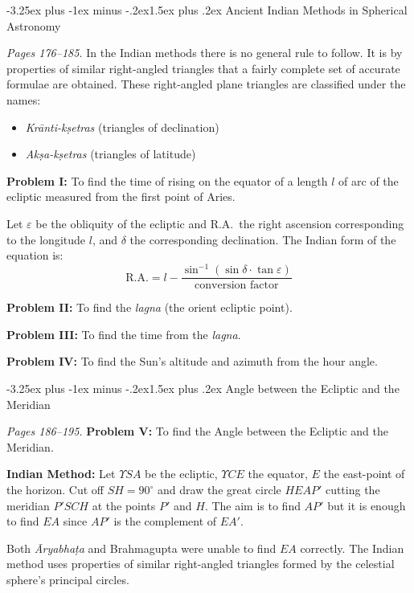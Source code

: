 \documentclass[11pt,a4paper]{article}
\makeatletter
\renewcommand{\subsection}{\@startsection{subsection}{2}{\z@}%
  {-3.25ex plus -1ex minus -.2ex}{1.5ex plus .2ex}%
  {\normalfont\large\bfseries\color{sectioncolor}}}
\newcommand{\cnote}[1]{\textcolor{notecolor}{\textit{#1}}}
\makeatother
\begin{document}
\subsection{Ancient Indian Methods in Spherical Astronomy}

\cnote{Pages 176--185.} In the Indian methods there is no general rule to follow. It is by properties of similar right-angled triangles that a fairly complete set of accurate formulae are obtained. These right-angled plane triangles are classified under the names:
\begin{itemize}
\item \textit{Krānti-kṣetras} (triangles of declination)
\item \textit{Akṣa-kṣetras} (triangles of latitude)
\end{itemize}

\textbf{Problem I:} To find the time of rising on the equator of a length $l$ of arc of the ecliptic measured from the first point of Aries.

Let $\varepsilon$ be the obliquity of the ecliptic and R.A.\ the right ascension corresponding to the longitude $l$, and $\delta$ the corresponding declination. The Indian form of the equation is:
\[
\text{R.A.} = l - \frac{\sin^{-1}(\sin \delta \cdot \tan \varepsilon)}{\text{conversion factor}}
\]

\textbf{Problem II:} To find the \textit{lagna} (the orient ecliptic point).

\textbf{Problem III:} To find the time from the \textit{lagna}.

\textbf{Problem IV:} To find the Sun's altitude and azimuth from the hour angle.

\subsection{Angle between the Ecliptic and the Meridian}

\cnote{Pages 186--195.} \textbf{Problem V:} To find the Angle between the Ecliptic and the Meridian.

\textbf{Indian Method:} Let $\Upsilon SA$ be the ecliptic, $\Upsilon CE$ the equator, $E$ the east-point of the horizon. Cut off $SH = 90^\circ$ and draw the great circle $HEAP'$ cutting the meridian $P'SCH$ at the points $P'$ and $H$. The aim is to find $AP'$ but it is enough to find $EA$ since $AP'$ is the complement of $EA'$.

Both \textit{Āryabhaṭa} and Brahmagupta were unable to find $EA$ correctly. The Indian method uses properties of similar right-angled triangles formed by the celestial sphere's principal circles.
\end{document}
